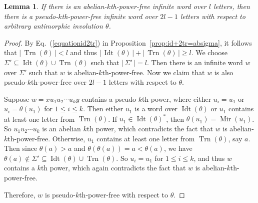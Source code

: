 \documentclass[12pt]{article}
\def\abs#1{{|\,#1\,|}}
\def\mirror{{\operatorname{Mir}}}
\def\id{{\operatorname{Idt}}}
\def\tr{{\operatorname{Trn}}}
\newtheorem{lemma}[theorem]{Lemma}
\begin{document}
\begin{lemma}\label{lemma:lemma1}
If there is an abelian-$k$th-power-free infinite word over $l$
letters, then there is a pseudo-$k$th-power-free infinite word over
$2l-1$ letters with respect to arbitrary antimorphic involution
$\theta$.
\end{lemma}
\begin{proof}
By Eq.~(\ref{equationid2tr}) in
Proposition~\ref{prop:id+2tr=absigma}, it follows that
$\abs{\tr(\theta)}<l$ and thus
$\abs{\id(\theta)}+\abs{\tr(\theta)}\geq l$. We choose
$\Sigma'\subseteq\id(\theta)\cup\tr(\theta)$ such that
$\abs{\Sigma'}=l$. Then there is an infinite word $w$ over $\Sigma'$
such that $w$ is abelian-$k$th-power-free. Now we claim that $w$ is
also pseudo-$k$th-power-free over $2l-1$ letters with respect to
$\theta$.

Suppose $w=xu_1u_2\cdots u_ky$ contains a pseudo-$k$th-power, where
either $u_i=u_1$ or $u_i=\theta(u_1)$ for $1\leq i\leq k$. Then
either $u_1$ is a word over $\id(\theta)$ or $u_1$ contains at least
one letter from $\tr(\theta)$. If $u_1\in\id(\theta)^*$, then
$\theta(u_1)=\mirror(u_1)$. So $u_1u_2\cdots u_k$ is an abelian
$k$th power, which contradicts the fact that $w$ is
abelian-$k$th-power-free. Otherwise, $u_1$ contains at least one
letter from $\tr(\theta)$, say $a$. Then since $\theta(a)>a$ and
$\theta(\theta(a))=a<\theta(a)$, we have
$\theta(a)\not\in\Sigma'\subseteq\id(\theta)\cup\tr(\theta)$. So
$u_i=u_1$ for $1\leq i\leq k$, and thus $w$ contains a $k$th power,
which again contradicts the fact that $w$ is
abelian-$k$th-power-free.

Therefore, $w$ is pseudo-$k$th-power-free with respect to $\theta$.
\end{proof}
\end{document}
